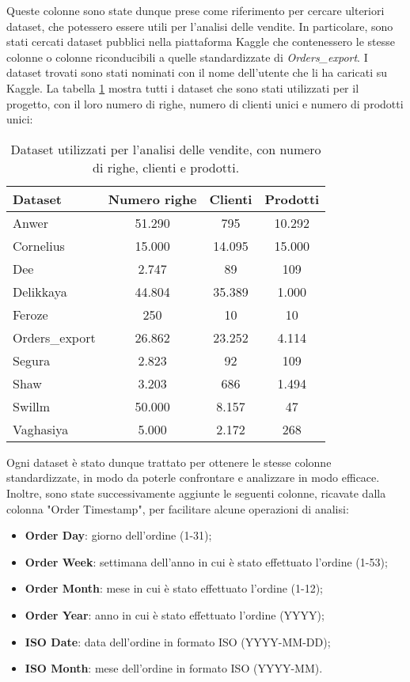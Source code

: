 Queste colonne sono state dunque prese come riferimento per cercare ulteriori dataset, che potessero essere utili per l'analisi delle vendite. In particolare, sono stati cercati dataset pubblici nella piattaforma Kaggle che contenessero le stesse colonne o colonne riconducibili a quelle standardizzate di \emph{Orders\_export}. I dataset trovati sono stati nominati con il nome dell'utente che li ha caricati su Kaggle.
La tabella \ref{tab:dataset-riassunto} mostra tutti i dataset che sono stati utilizzati per il progetto, con il loro numero di righe, numero di clienti unici e numero di prodotti unici:
\begin{table}[h]
    \centering
    \begin{tabular}{|l|c|c|c|}
        \hline
        \textbf{Dataset} & \textbf{Numero righe} & \textbf{Clienti} & \textbf{Prodotti} \\
        \hline
        Anwer          & 51.290 & 795   & 10.292 \\
        Cornelius      & 15.000 & 14.095 & 15.000 \\
        Dee            & 2.747  & 89    & 109 \\
        Delikkaya      & 44.804 & 35.389 & 1.000 \\
        Feroze         & 250   & 10    & 10 \\
        Orders\_export & 26.862 & 23.252 & 4.114 \\
        Segura         & 2.823  & 92    & 109 \\
        Shaw           & 3.203  & 686   & 1.494 \\
        Swillm         & 50.000 & 8.157  & 47 \\
        Vaghasiya      & 5.000  & 2.172  & 268 \\
        \hline
    \end{tabular}
    \caption{Dataset utilizzati per l’analisi delle vendite, con numero di righe, clienti e prodotti.}
    \label{tab:dataset-riassunto}
\end{table}

Ogni dataset è stato dunque trattato per ottenere le stesse colonne standardizzate, in modo da poterle confrontare e analizzare in modo efficace.
Inoltre, sono state successivamente aggiunte le seguenti colonne, ricavate dalla colonna "Order Timestamp", per facilitare alcune operazioni di analisi:
\begin{itemize}
    \item \textbf{Order Day}: giorno dell'ordine (1-31);
    \item \textbf{Order Week}: settimana dell'anno in cui è stato effettuato l'ordine (1-53);
    \item \textbf{Order Month}: mese in cui è stato effettuato l'ordine (1-12);
    \item \textbf{Order Year}: anno in cui è stato effettuato l'ordine (YYYY);
    \item \textbf{ISO Date}: data dell'ordine in formato ISO (YYYY-MM-DD);
    \item \textbf{ISO Month}: mese dell'ordine in formato ISO (YYYY-MM).
\end{itemize}

